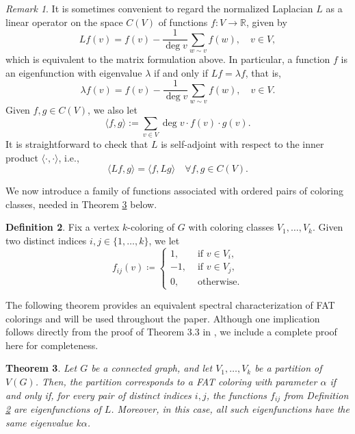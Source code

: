 \documentclass{article}
\theoremstyle{plain}
\newtheorem{theorem}{Theorem}[section]
\theoremstyle{definition}
\newtheorem{definition}[theorem]{Definition}
\theoremstyle{remark}
\newtheorem{remark}[theorem]{Remark}
\begin{document}
\begin{remark}
    It is sometimes convenient to regard the normalized Laplacian $L$ as a linear operator on the space $C(V)$ of functions $f:V\to\mathbb{R}$, given by
    \[
    Lf(v) = f(v) - \frac{1}{\deg v}\sum_{w\sim v} f(w), \quad v\in V,
    \]
    which is equivalent to the matrix formulation above. In particular, a function $f$ is an eigenfunction with eigenvalue $\lambda$ if and only if $Lf=\lambda f$, that is,
    \begin{equation}\label{eq:eigenpair}
        \lambda f(v) = f(v) - \frac{1}{\deg v}\sum_{w\sim v} f(w), \quad v\in V.
    \end{equation}
    Given $f,g\in C(V)$, we also let
	\begin{equation}\label{eq:innerproduct}
	\langle f,g\rangle:=\sum_{v\in V}\deg v\cdot f(v)\cdot g(v).
	\end{equation}
    It is straightforward to check that $L$ is self-adjoint with respect to the inner product $	\langle \cdot,\cdot \rangle$, i.e.,
	\begin{equation*}
	\langle Lf,g\rangle=\langle f,Lg\rangle \quad \forall f,g\in C(V).
	\end{equation*}
\end{remark}

We now introduce a family of functions associated with ordered pairs of coloring classes, needed in Theorem \ref{thm:eigenfunctions} below.

\begin{definition}\label{def:f_ij}
   Fix a vertex $k$-coloring of $G$ with coloring classes $V_1,\ldots,V_k$. Given two distinct indices $i,j\in\{1,\ldots,k\}$, we let
    \[
    f_{ij}(v) \coloneqq \begin{cases}
        1, &\text{ if } v\in V_i,\\
        -1, &\text{ if } v\in V_j,\\
        0, &\text{ otherwise.}
    \end{cases}
    \]
\end{definition}



The following theorem provides an equivalent spectral characterization of FAT colorings and will be used throughout the paper. Although one implication follows directly from the proof of Theorem 3.3 in \cite{beersmulasFAT}, we include a complete proof here for completeness.\\



\begin{theorem}\label{thm:eigenfunctions}
    Let $G$ be a connected graph, and let $V_1,\ldots,V_k$ be a partition of $V(G)$. Then, the partition corresponds to a FAT coloring with parameter $\alpha$ if and only if, for every pair of distinct indices $i,j$, the functions $f_{ij}$ from Definition \ref{def:f_ij} are eigenfunctions of $L$. Moreover, in this case, all such eigenfunctions have the same eigenvalue $k\alpha$. 
\end{theorem}
\end{document}
